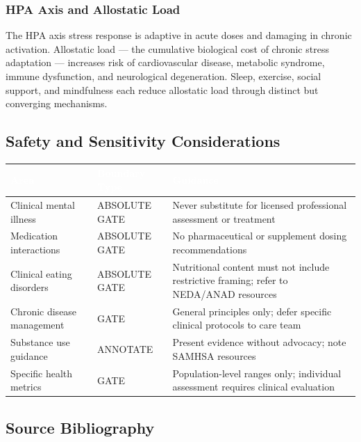 \documentclass[11pt,letterpaper]{article}
\newcommand{\tableheader}[1]{\textbf{\sffamily\textcolor{white}{#1}}}
\begin{document}
\subsubsection{HPA Axis and Allostatic Load}

The HPA axis stress response is adaptive in acute doses and damaging in chronic activation. Allostatic load --- the cumulative biological cost of chronic stress adaptation --- increases risk of cardiovascular disease, metabolic syndrome, immune dysfunction, and neurological degeneration. Sleep, exercise, social support, and mindfulness each reduce allostatic load through distinct but converging mechanisms.

\subsection{Safety and Sensitivity Considerations}

\begin{center}
\begin{tabularx}{\textwidth}{L{4.5cm}L{2.5cm}X}
\toprule
{}
\tableheader{Area} & \tableheader{Boundary Type} & \tableheader{Guidance} \\
\midrule
Clinical mental illness & ABSOLUTE GATE & Never substitute for licensed professional assessment or treatment \\
Medication interactions & ABSOLUTE GATE & No pharmaceutical or supplement dosing recommendations \\
Clinical eating disorders & ABSOLUTE GATE & Nutritional content must not include restrictive framing; refer to NEDA/ANAD resources \\
Chronic disease management & GATE & General principles only; defer specific clinical protocols to care team \\
Substance use guidance & ANNOTATE & Present evidence without advocacy; note SAMHSA resources \\
Specific health metrics & GATE & Population-level ranges only; individual assessment requires clinical evaluation \\
\bottomrule
\end{tabularx}
\end{center}

\subsection{Source Bibliography}
\end{document}
